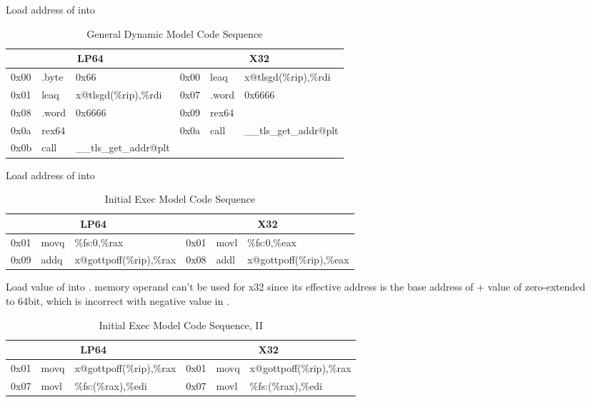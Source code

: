 \begin{description}
\item[]
  Load address of  into 

\begin{table}[H]
\Hrule
\caption{General Dynamic Model Code Sequence}
\begin{center}
\code\small{
\begin{tabular}{lll|lll}
\multicolumn{3}{c}{LP64} & \multicolumn{3}{c}{X32} \\
\hline
0x00 & .byte & 0x66			& 0x00 & leaq  & x@tlsgd(\%rip),\%rdi \\
0x01 & leaq  & x@tlsgd(\%rip),\%rdi	& 0x07 & .word & 0x6666 \\
0x08 & .word & 0x6666			& 0x09 & rex64 & \\
0x0a & rex64 &				& 0x0a & call  & \_\_tls\_get\_addr@plt \\
0x0b & call  & \_\_tls\_get\_addr@plt	&      &       & \\
\end{tabular}
}
\end{center}
\Hrule
\end{table}

\item[]
  Load address of  into 

\begin{table}[H]
\Hrule
\caption{Initial Exec Model Code Sequence}
\begin{center}
\code\small{
\begin{tabular}{lll|lll}
\multicolumn{3}{c}{LP64} & \multicolumn{3}{c}{X32} \\
\hline
0x01 & movq & \%fs:0,\%rax		& 0x01 & movl & \%fs:0,\%eax \\
0x09 & addq & x@gottpoff(\%rip),\%rax	& 0x08 & addl & x@gottpoff(\%rip),\%eax \\
\end{tabular}
}
\end{center}
\Hrule
\end{table}

\item[]
  Load value of  into .   memory
  operand can't be used for x32 since its effective address is
  the base address of  + value of  zero-extended
  to 64bit, which is incorrect with negative value in .

\begin{table}[H]
\Hrule
\caption{Initial Exec Model Code Sequence, II}
\begin{center}
\code\small{
\begin{tabular}{lll|lll}
\multicolumn{3}{c}{LP64} & \multicolumn{3}{c}{X32} \\
\hline
0x01 & movq & x@gottpoff(\%rip),\%rax	& 0x01 & movq & x@gottpoff(\%rip),\%rax \\
0x07 & movl & \%fs:(\%rax),\%edi	& 0x07 & movl & \%fs:(\%rax),\%edi \\
\end{tabular}
}
\end{center}
\Hrule
\end{table}


\end{description}
